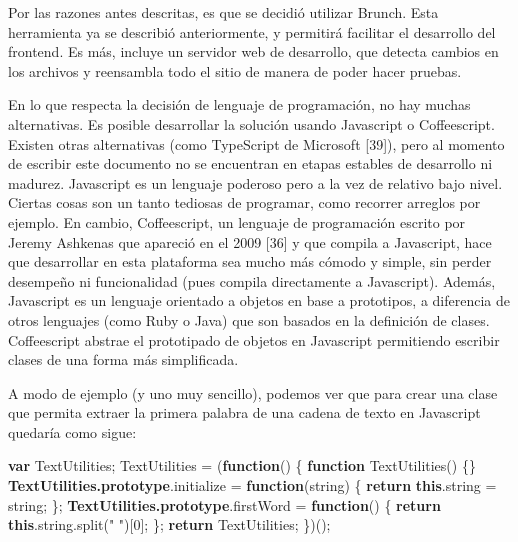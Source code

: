 \documentclass[12pt,spanish,letter]{report}
\newenvironment{Shaded}{}{}
\newcommand{\KeywordTok}[1]{\textcolor[rgb]{0.00,0.44,0.13}{\textbf{{#1}}}}
\newcommand{\DecValTok}[1]{\textcolor[rgb]{0.25,0.63,0.44}{{#1}}}
\newcommand{\StringTok}[1]{\textcolor[rgb]{0.25,0.44,0.63}{{#1}}}
\newcommand{\FunctionTok}[1]{\textcolor[rgb]{0.02,0.16,0.49}{{#1}}}
\newcommand{\NormalTok}[1]{{#1}}
\begin{document}
Por las razones antes descritas, es que se decidió utilizar Brunch. Esta
herramienta ya se describió anteriormente, y permitirá facilitar el
desarrollo del frontend. Es más, incluye un servidor web de desarrollo,
que detecta cambios en los archivos y reensambla todo el sitio de manera
de poder hacer pruebas.

En lo que respecta la decisión de lenguaje de programación, no hay
muchas alternativas. Es posible desarrollar la solución usando
Javascript o Coffeescript. Existen otras alternativas (como TypeScript
de Microsoft {[}39{]}), pero al momento de escribir este documento no se
encuentran en etapas estables de desarrollo ni madurez. Javascript es un
lenguaje poderoso pero a la vez de relativo bajo nivel. Ciertas cosas
son un tanto tediosas de programar, como recorrer arreglos por ejemplo.
En cambio, Coffeescript, un lenguaje de programación escrito por Jeremy
Ashkenas que apareció en el 2009 {[}36{]} y que compila a Javascript,
hace que desarrollar en esta plataforma sea mucho más cómodo y simple,
sin perder desempeño ni funcionalidad (pues compila directamente a
Javascript). Además, Javascript es un lenguaje orientado a objetos en
base a prototipos, a diferencia de otros lenguajes (como Ruby o Java)
que son basados en la definición de clases. Coffeescript abstrae el
prototipado de objetos en Javascript permitiendo escribir clases de una
forma más simplificada.

A modo de ejemplo (y uno muy sencillo), podemos ver que para crear una
clase que permita extraer la primera palabra de una cadena de texto en
Javascript quedaría como sigue:

\begin{Shaded}
\begin{Highlighting}[]
\KeywordTok{var} \NormalTok{TextUtilities;}
\NormalTok{TextUtilities = (}\KeywordTok{function}\NormalTok{() \{}
  \KeywordTok{function} \NormalTok{TextUtilities() \{\}}
  \KeywordTok{TextUtilities.prototype}\NormalTok{.}\FunctionTok{initialize} \NormalTok{= }\KeywordTok{function}\NormalTok{(string) \{}
    \KeywordTok{return} \KeywordTok{this}\NormalTok{.}\FunctionTok{string} \NormalTok{= string;}
  \NormalTok{\};}
  \KeywordTok{TextUtilities.prototype}\NormalTok{.}\FunctionTok{firstWord} \NormalTok{= }\KeywordTok{function}\NormalTok{() \{}
    \KeywordTok{return} \KeywordTok{this}\NormalTok{.}\FunctionTok{string}\NormalTok{.}\FunctionTok{split}\NormalTok{(}\StringTok{" "}\NormalTok{)[}\DecValTok{0}\NormalTok{];}
  \NormalTok{\};}
  \KeywordTok{return} \NormalTok{TextUtilities;}
\NormalTok{\})();}
\end{Highlighting}
\end{Shaded}
\end{document}
